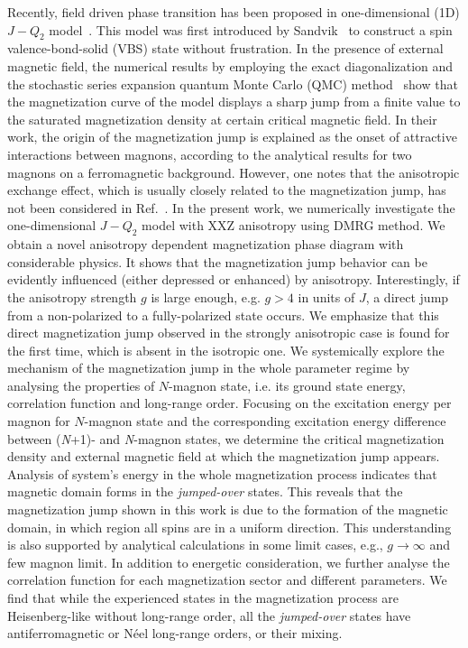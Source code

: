 \documentclass[article,10pt,onecolumn,superscriptaddress,floatfix]{revtex4}
\begin{document}
Recently, field driven phase transition has been proposed in one-dimensional (1D) $J-Q_{2}$ model~\cite{Adam2015,Adam2016}. This model was first introduced by Sandvik~\cite{Sandvik2007} to construct a spin valence-bond-solid (VBS) state without frustration.
In the presence of external magnetic field, the numerical results by employing the exact diagonalization and the stochastic series expansion quantum Monte Carlo (QMC) method~\cite{Syljuasen2002} show that the magnetization curve of the model displays a sharp jump from a finite value to the saturated magnetization density at certain critical magnetic field.
In their work, the origin of the magnetization jump is explained as the onset of attractive interactions between magnons, according to the analytical results for two magnons on a ferromagnetic background. However, one notes that the anisotropic exchange effect, which is usually closely related to the magnetization jump, has not been considered in Ref.~\cite{Adam2016}.
In the present work, we numerically investigate the one-dimensional $J-Q_{2}$ model with XXZ anisotropy using DMRG method. We obtain a novel anisotropy dependent magnetization phase diagram with considerable physics.
It shows that the magnetization jump behavior can be evidently influenced (either depressed or enhanced) by anisotropy.
Interestingly, if the anisotropy strength $g$ is large enough, e.g. $g>4$ in units of $J$, a direct jump from a non-polarized to a fully-polarized state occurs.
We emphasize that this direct magnetization jump observed in the strongly anisotropic case is found for the first time, which is absent in the isotropic one.
We systemically explore the mechanism of the magnetization jump in the whole parameter regime by analysing the properties of $N$-magnon state, i.e. its ground state energy, correlation function and long-range order. Focusing on the excitation energy per magnon for $N$-magnon state and the corresponding excitation energy difference between (\textit{N}+1)- and \textit{N}-magnon states, we determine the critical magnetization density and external magnetic field at which the magnetization jump appears.
Analysis of system's energy in the whole magnetization process indicates that magnetic domain forms in the \textit{jumped-over} states. This reveals that the magnetization jump shown in this work is due to the formation of the magnetic domain, in which region all spins are in a uniform direction. 
This understanding is also supported by analytical calculations in some limit cases, e.g., $g\rightarrow\infty$ and few magnon limit. 
In addition to energetic consideration, we further analyse the correlation function for each magnetization sector and different  parameters. 
We find that while the experienced states in the magnetization process are Heisenberg-like without long-range order, all the \textit{jumped-over} states have antiferromagnetic or N\'eel long-range orders, or their mixing.
\end{document}
